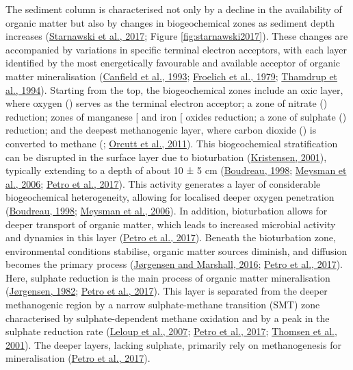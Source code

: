 \documentclass[
  12 pt,
]{book}
\begin{document}
The sediment column is characterised not only by a decline in the availability of organic matter but also by changes in biogeochemical zones as sediment depth increases (\protect\hyperlink{ref-Starnawski2017}{Starnawski et al., 2017}; Figure \ref{fig:starnawski2017}). These changes are accompanied by variations in specific terminal electron acceptors, with each layer identified by the most energetically favourable and available acceptor of organic matter mineralisation (\protect\hyperlink{ref-Canfield1993}{Canfield et al., 1993}; \protect\hyperlink{ref-Froelich1979}{Froelich et al., 1979}; \protect\hyperlink{ref-Thamdrup1994}{Thamdrup et al., 1994}). Starting from the top, the biogeochemical zones include an oxic layer, where oxygen () serves as the terminal electron acceptor; a zone of nitrate () reduction; zones of manganese {[}\ch{Mn({IV})}{]} and iron {[}\ch{Fe({III})}{]} oxides reduction; a zone of sulphate () reduction; and the deepest methanogenic layer, where carbon dioxide () is converted to methane (; \protect\hyperlink{ref-Orcutt2011}{Orcutt et al., 2011}). This biogeochemical stratification can be disrupted in the surface layer due to bioturbation (\protect\hyperlink{ref-Kristensen2001}{Kristensen, 2001}), typically extending to a depth of about 10 ± 5 \si{\cm} (\protect\hyperlink{ref-Boudreau1998}{Boudreau, 1998}; \protect\hyperlink{ref-Meysman2006}{Meysman et al., 2006}; \protect\hyperlink{ref-Petro2017}{Petro et al., 2017}). This activity generates a layer of considerable biogeochemical heterogeneity, allowing for localised deeper oxygen penetration (\protect\hyperlink{ref-Boudreau1998}{Boudreau, 1998}; \protect\hyperlink{ref-Meysman2006}{Meysman et al., 2006}). In addition, bioturbation allows for deeper transport of organic matter, which leads to increased microbial activity and dynamics in this layer (\protect\hyperlink{ref-Petro2017}{Petro et al., 2017}). Beneath the bioturbation zone, environmental conditions stabilise, organic matter sources diminish, and diffusion becomes the primary process (\protect\hyperlink{ref-Jorgensen2016}{Jørgensen and Marshall, 2016}; \protect\hyperlink{ref-Petro2017}{Petro et al., 2017}). Here, sulphate reduction is the main process of organic matter mineralisation (\protect\hyperlink{ref-Jorgensen1982}{Jørgensen, 1982}; \protect\hyperlink{ref-Petro2017}{Petro et al., 2017}). This layer is separated from the deeper methanogenic region by a narrow sulphate-methane transition (SMT) zone characterised by sulphate-dependent methane oxidation and by a peak in the sulphate reduction rate (\protect\hyperlink{ref-Leloup2007}{Leloup et al., 2007}; \protect\hyperlink{ref-Petro2017}{Petro et al., 2017}; \protect\hyperlink{ref-Thomsen2001}{Thomsen et al., 2001}). The deeper layers, lacking sulphate, primarily rely on methanogenesis for mineralisation (\protect\hyperlink{ref-Petro2017}{Petro et al., 2017}).
\end{document}
